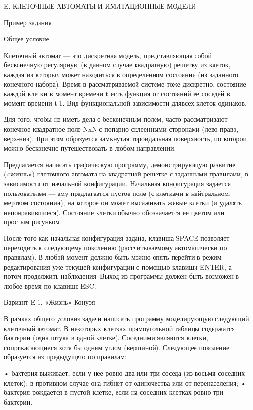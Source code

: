 E. КЛЕТОЧНЫЕ АВТОМАТЫ И ИМИТАЦИОННЫЕ МОДЕЛИ

Пример задания

Общее условие

Клеточный автомат — это дискретная модель, представляющая собой бесконечную
регулярную (в данном случае квадратную) решетку из клеток, каждая из которых
может находиться в определенном состоянии (из заданного конечного набора).
Время в рассматриваемой системе тоже дискретно, состояние каждой клетки в
момент времени t есть функция от состояний ее соседей в момент времени t-1.
Вид функциональной зависимости длявсех клеток одинаков.

Для того, чтобы не иметь дела с бесконечным полем, часто рассматривают
конечное квадратное поле NxN с попарно склеенными сторонами (лево-право,
верх-низ). При этом образуется замкнутая тороидальная поверхность, по которой
можно бесконечно путешествовать в любом направлении.

Предлагается написать графическую программу, демонстрирующую развитие
(«жизнь») клеточного автомата на квадратной решетке с заданными правилами, в
зависимости от начальной конфигурации. Начальная конфигурация задается
пользователем — ему предлагается пустое поле (с клетками в нейтральном,
мертвом состоянии), на которое он может высаживать живые клетки (и удалять
непонравившиеся). Состояние клетки обычно обозначается ее цветом или простым
рисунком.

После того как начальная конфигурация задана, клавиша SPACE позволяет
переходить к следующему поколению (рассчитываемому автоматически по правилам).
В любой момент должно быть можно опять перейти в режим редактирования уже
текущей конфигурации с помощью клавиши ENTER, а потом продолжить наблюдения.
Выход из программы должен быть возможен в любое время по клавише ESC.


Вариант E-1. «Жизнь» Конуэя

В рамках общего условия задачи написать программу моделирующую следующий
клеточный автомат. В некоторых клетках прямоугольной таблицы содержатся
бактерии (одна штука в одной клетке). Соседними являются клетки,
соприкасающиеся хотя бы одним углом (вершиной). Следующее поколение образуется
из предыдущего по правилам:

• бактерия выживает, если у нее ровно два или три соседа (из восьми соседних
  клеток); в противном случае она гибнет от одиночества или от перенаселения;
• бактерия рождается в пустой клетке, если на соседних клетках ровно три
  бактерии.

